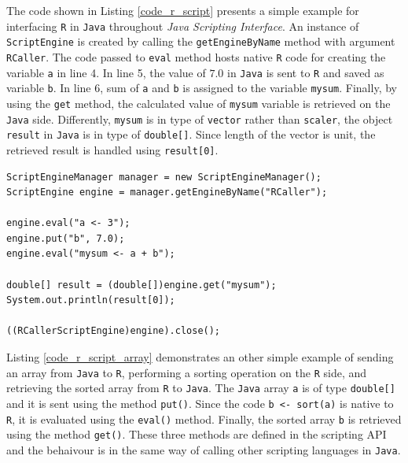 \documentclass[10pt,a4paper, final, oneside]{article}
\begin{document}
The code shown in Listing \ref{code_r_script} presents a simple example for interfacing \texttt{R} in \texttt{Java} throughout \emph{Java Scripting Interface}. An instance of \texttt{ScriptEngine} is created by calling the \texttt{getEngineByName} method with argument \texttt{RCaller}. The code passed to \texttt{eval} method hosts native \texttt{R} code for creating the variable \texttt{a} in line 4. In line 5, the value of $7.0$ in \texttt{Java} is sent to \texttt{R} and saved as variable \texttt{b}. In line 6, sum of \texttt{a} and  \texttt{b} is assigned to the variable \texttt{mysum}. Finally, by using the \texttt{get} method, the calculated value of \texttt{mysum} variable is retrieved on the \texttt{Java} side. Differently, \texttt{mysum} is in type of \texttt{vector} rather than \texttt{scaler}, the object \texttt{result} in \texttt{Java} is in type of \texttt{double[]}. Since length of the vector is unit, the retrieved result is handled using \texttt{result[0]}.

\begin{minipage}{\linewidth}
\begin{lstlisting}[caption=Calling R,label=code_r_script]
ScriptEngineManager manager = new ScriptEngineManager();
ScriptEngine engine = manager.getEngineByName("RCaller");
        
engine.eval("a <- 3");
engine.put("b", 7.0);
engine.eval("mysum <- a + b");
        
double[] result = (double[])engine.get("mysum");
System.out.println(result[0]);
        
((RCallerScriptEngine)engine).close();
\end{lstlisting}
\end{minipage}

Listing \ref{code_r_script_array} demonstrates an other simple example of sending an array from \texttt{Java} to \texttt{R}, performing a sorting operation on the \texttt{R} side, and retrieving the sorted array from \texttt{R} to \texttt{Java}. The \texttt{Java} array \texttt{a} is of type \texttt{double[]} and it is sent using the method \texttt{put()}. Since the code \texttt{b <- sort(a)} is native to \texttt{R}, it is evaluated using the \texttt{eval()} method. Finally, the sorted array \texttt{b} is retrieved using the method \texttt{get()}. These three methods are defined in the scripting API and the behaivour is in the same way of calling other scripting languages in \texttt{Java}. 
\end{document}
